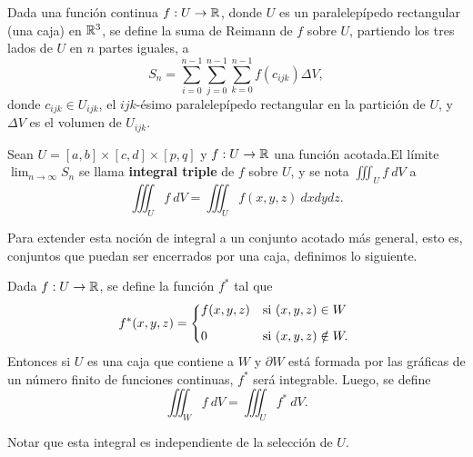 \begin{definition}
Dada una funci\'on continua $f:U\to\mathbb{R}$, donde $U$ es un paralelep\'ipedo rectangular (una caja) en $\mathbb{R}^3$, se define la suma de Reimann de $f$ sobre $U$, partiendo los tres lados de $U$ en $n$ partes iguales, a
\[
    S_n=\sum_{i=0}^{n-1}\sum_{j=0}^{n-1}\sum_{k=0}^{n-1}f(c_{ijk})\Delta V,
\]  
donde $c_{ijk}\in U_{ijk}$, el $ijk$-\'esimo paralelep\'ipedo rectangular en la partici\'on de $U$, y $\Delta V$ es el volumen de $U_{ijk}$.
\end{definition}

\begin{definition} 
    Sean $U=[a,b]\times[c,d]\times[p,q]$ y $f:U\to\mathbb{R}$ una funci\'on acotada.El l\'imite $\lim_{n\to\infty}S_n$ se llama \textbf{integral triple} de $f$ sobre $U$, y se nota $\iiint_U f\:dV$ a
    \[
          \iiint_U f\:dV=\iiint_U f(x,y,z)\:dxdydz.
    \]
\end{definition}

Para extender esta noci\'on de integral a un conjunto acotado m\'as general, esto es, conjuntos que puedan ser encerrados por una caja, definimos lo siguiente. 

\begin{definition}
Dada $f:U\to\mathbb{R}$, se define la funci\'on $f^*$ tal que
\[
    f^*(x,y,z)=
    \begin{dcases*}
        f(x,y,z) & si $(x,y,z)\in W$ \\[.2cm]
        0        & si $(x,y,z)\notin W.$
    \end{dcases*}
\]
Entonces si $U$ es una caja que contiene a $W$ y $\partial W$ est\'a formada por las gr\'aficas de un n\'umero finito de funciones continuas, $f^*$ ser\'a integrable. Luego, se define
\[
    \iiint_W f\:dV=\iiint_U f^*\:dV.  
\]
\end{definition}

\begin{obs} 
    Notar que esta integral es independiente de la selecci\'on de $U$.
\end{obs}

